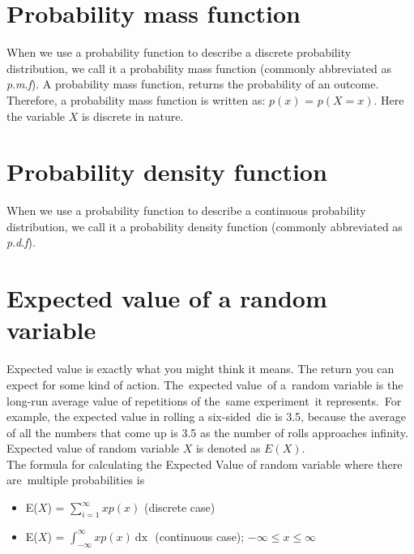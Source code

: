 \documentclass[
]{book}
\begin{document}
\hypertarget{probability-mass-function}{%
\section{Probability mass function}\label{probability-mass-function}}

When we use a probability function to describe a discrete probability
distribution, we call it a probability mass function (commonly
abbreviated as \emph{p}.\emph{m}.\emph{f}). A probability mass function, returns the
probability of an outcome. Therefore, a probability mass function is
written as: \(p(x)\) = \(p(X = x)\). Here the variable \(X\) is discrete in
nature.

\hypertarget{probability-density-function}{%
\section{Probability density function}\label{probability-density-function}}

When we use a probability function to describe a continuous probability
distribution, we call it a probability density function (commonly
abbreviated as \emph{p}.\emph{d}.\emph{f}).

\hypertarget{expected-value-of-a-random-variable}{%
\section{Expected value of a random variable}\label{expected-value-of-a-random-variable}}

Expected value is exactly what you might think it means. The return you
can expect for some kind of action. The~expected value~of a~random
variable is the long-run average value of repetitions of the~same
experiment~it represents.~For example, the expected value in rolling a
six-sided~die is 3.5, because the average of all the numbers that come
up is 3.5 as the number of rolls approaches infinity. Expected value of
random variable \(X\) is denoted as \(E(X)\).\\
The formula for calculating the Expected Value of random variable where
there are~multiple probabilities is

\begin{itemize}
\item
  E(\(X\)) = \(\sum_{i = 1}^{\infty}xp(x)\) (discrete case)
\item
  E(\(X\)) = \(\int_{- \infty}^{\infty}{x p(x)\ \text{dx }}\) (continuous
  case); \(- \infty \leq x \leq \infty\)
\end{itemize}
\end{document}
